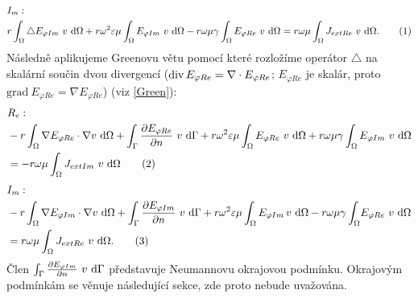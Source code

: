 \documentclass[12pt,a4paper,oneside]{article}
\numberwithin{equation}{section} %
\numberwithin{figure}{section} %
\numberwithin{table}{section} %
\newcommand{\grad}{\mathrm{grad}\ }
\newcommand\numberthis{\addtocounter{equation}{1}\tag{\theequation}}
\begin{document}
\begin{align*}
&I_m:
\\
&r \int _{\Omega} \triangle E _{\varphi Im} ~ v ~ \ud \Omega + r \omega ^2 \varepsilon \mu \int _{\Omega} E _{\varphi Im} ~ v ~ \ud \Omega - r \omega \mu \gamma \int _{\Omega} E _{\varphi Re} ~ v ~ \ud \Omega = r \omega \mu \int _{\Omega} J _{extRe} ~ v ~ \ud \Omega .
\numberthis
\end{align*}
Následně aplikujeme Greenovu větu pomocí které rozložíme operátor $\triangle$ na skalární součin dvou divergencí ($\mathop{\rm div}\nolimits E _{\varphi Re} = \nabla \cdot E _{\varphi Re}$; $E _{\varphi Re}$ je skalár, proto $\grad E _{\varphi Re} = \nabla E _{\varphi Re}$) (viz \ref{Green}):
\begin{align*}
&R_e:
\\
&- r \int _{\Omega} \nabla E _{\varphi Re} \cdot \nabla v ~ \ud \Omega + \int _{\Gamma} \frac{\partial E _{\varphi Re}}{\partial n} ~ v ~ \ud \Gamma + r \omega ^2 \varepsilon \mu \int _{\Omega} E _{\varphi Re} ~ v ~ \ud \Omega + r \omega \mu \gamma \int _{\Omega} E _{\varphi Im} ~ v ~ \ud \Omega 
\\
&= - r \omega \mu \int _{\Omega} J _{extIm} ~ v ~ \ud \Omega
\numberthis
\end{align*}
\begin{align*}
&I_m:
\\
&- r \int _{\Omega} \nabla E _{\varphi Im} \cdot \nabla v ~ \ud \Omega + \int _{\Gamma} \frac{\partial E _{\varphi Im}}{\partial n} ~ v ~ \ud \Gamma + r \omega ^2 \varepsilon \mu \int _{\Omega} E _{\varphi Im} \! ~ v ~ \ud \Omega - r \omega \mu \gamma \int _{\Omega} \! E _{\varphi Re} ~ v ~ \ud \Omega 
\\
&= r \omega \mu \int _{\Omega} J _{extRe} ~ v ~ \ud \Omega .
\numberthis
\end{align*}
Člen $\int _{\Gamma} \frac{\partial E _{\varphi Im}}{\partial n} ~ v ~ \mathrm{d} \Gamma$ představuje Neumannovu okrajovou podmínku. Okrajovým podmínkám se věnuje následující sekce, zde proto nebude uvažována.
\end{document}

